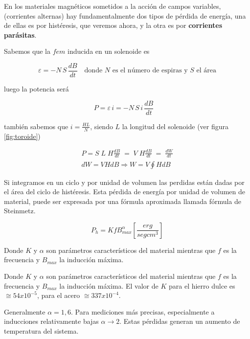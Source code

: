 En los materiales magnéticos sometidos a la acción de campos variables,(corrientes alternas) hay fundamentalmente dos tipos de pérdida de energía, una de ellas es por histéresis, que veremos ahora, y la otra es por \textbf{corrientes parásitas}.

Sabemos que la $fem$ inducida en un solenoide es

\begin{equation}
\varepsilon = - N\,S\, \frac{dB}{dt}\quad \text{donde $N$ es el número de espiras y $S$ el área} 
\end{equation}

luego la potencia será

\begin{equation}
P = \varepsilon\,i = - N\,S\,i\, \frac{dB}{dt}\quad 
\end{equation}


también sabemos que $i=\frac{HL}{N}$, siendo $L$ la longitud del solenoide (ver figura \ref{fig:toroide}) 

\begin{equation}
\begin{aligned}
P = S\; L \; H \frac{dB}{dt} \; = \; V \; H \frac{dB}{dt} \; = \; \frac{dW}{dt} \\
dW = V H dB \Rightarrow W = V \oint H dB 
\end{aligned}
\end{equation}

Si integramos en un ciclo y por unidad de volumen las perdidas están dadas por el área del ciclo de histéresis. Esta pérdida de energía por unidad de volumen de material, puede ser expresada por una fórmula aproximada llamada fórmula de Steinmetz.

\begin{equation}
P_{h} = K f B_{max}^{\alpha}\left[ \frac{erg}{seg cm^{3}} \right] 
\end{equation}

Donde $K$ y $\alpha$ son parámetros característicos del material mientras que $f$ es la frecuencia y $B_{max}$ la inducción máxima. 

Donde $K$ y $\alpha$ son parámetros característicos del material mientras que $f$ es la frecuencia y $B_{max}$ la inducción máxima. El valor de $K$ para el hierro dulce es $\cong 54x10^{−5}$, para el acero $\cong 337x10^{−4}$.

Generalmente $\alpha = 1,6$. Para mediciones más precisas, especialmente a inducciones relativamente bajas ${\alpha\rightarrow 2}$. Estas pérdidas generan un aumento de temperatura del sistema.


